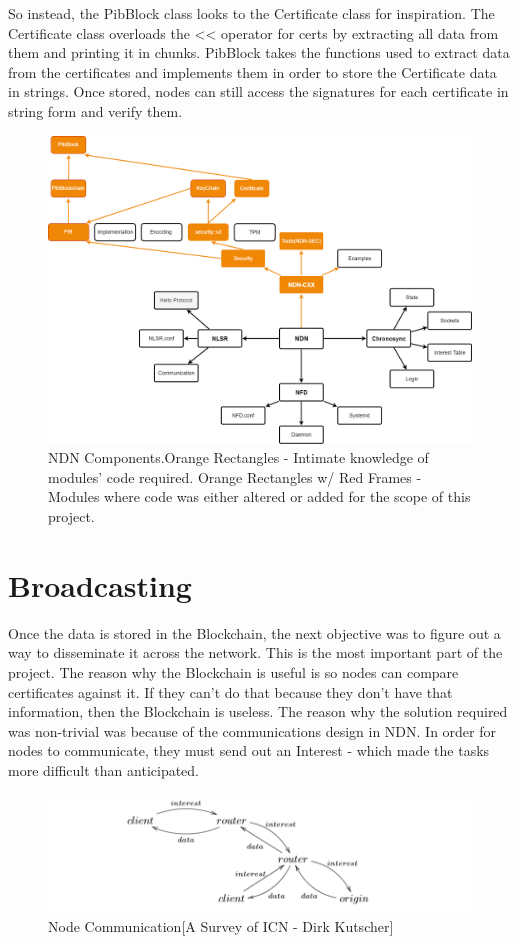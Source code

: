 So instead, the PibBlock class looks to the Certificate class for inspiration. The Certificate class overloads the << operator for certs by extracting all data from them and printing it in chunks. PibBlock takes the functions used to extract data from the certificates and implements them in order to store the Certificate data in strings. Once stored, nodes can still access the signatures for each certificate in string form and verify them.
\vfill
\begin{figure}[h]
\includegraphics[width=6in]{NDN.png}
\caption{
NDN Components.Orange Rectangles - Intimate knowledge of modules' code required. Orange Rectangles w/ Red Frames - Modules where code was either altered or added for the scope of this project.}
\end{figure}
\section{Broadcasting}
Once the data is stored in the Blockchain, the next objective was to figure out a way to disseminate it across the network. This is the most important part of the project. The reason why the Blockchain is useful is so nodes can compare certificates against it. If they can't do that because they don't have that information, then the Blockchain is useless. The reason why the solution required was non-trivial was because of the communications design in NDN. In order for nodes to communicate, they must send out an Interest - which made the tasks more difficult than anticipated. \par 
\begin{figure}[h]
\includegraphics[width=6in]{comms.png}
\caption{Node Communication[A Survey of ICN - Dirk Kutscher]}
\end{figure}
